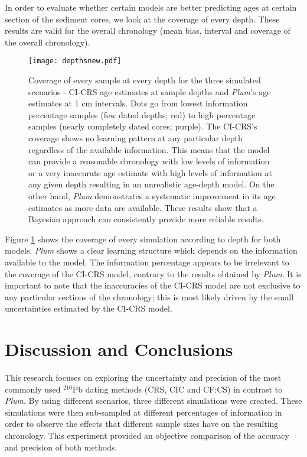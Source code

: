 \documentclass [10pt] {article}
\begin{document}
In order to evaluate whether certain models are better predicting ages at certain section of the sediment cores, we look at the coverage of every depth. 
These results are valid for the overall chronology (mean bias, interval and coverage of the overall chronology). 

\begin{figure}[!]
	\begin{centering}
		\texttt{[image: depthsnew.pdf]}
		\caption{Coverage of every sample at every depth for the three simulated scenarios - CI-CRS age estimates at sample depths and \textit{Plum}'s age estimates at 1 cm intervals. Dots go from lowest information percentage samples (few dated depths; red) to high percentage samples (nearly completely dated cores; purple). The CI-CRS's coverage shows no learning pattern at any particular depth regardless of the available information. This means that the model can provide a reasonable chronology with low levels of information or a very inaccurate age estimate with high levels of information at any given depth resulting in an unrealistic age-depth model. On the other hand, \textit{Plum} demonstrates a systematic improvement in its age estimates as more data are available. These results show that a Bayesian approach can consistently provide more reliable results.     }
		\label{fig:depths}
	\end{centering}
\end{figure}

Figure \ref{fig:depths} shows the coverage of every simulation according to depth for both models.
\textit{Plum} shows a clear learning structure which depends on the information available to the model.
The information percentage appears to be irrelevant to the coverage of the CI-CRS model, contrary to the results obtained by \textit{Plum}.
It is important to note that the inaccuracies of the CI-CRS model are not exclusive to any particular sections of the chronology; this is most likely driven by the small uncertainties estimated by the CI-CRS model.



\section{Discussion and Conclusions}

This research focuses on exploring the uncertainty and precision of the most commonly used $^{210}$Pb dating methods (CRS, CIC and CF:CS) in contrast to \textit{Plum}.
By using different scenarios, three different simulations were created.
These simulations were then sub-sampled at different percentages of information in order to observe the effects that different sample sizes have on the resulting chronology. 
This experiment provided an objective comparison of the accuracy and precision of both methods.
\end{document}

